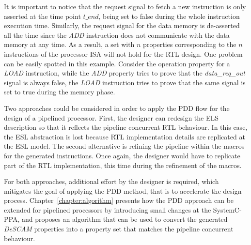 It is important to notice that the request signal to fetch a new instruction is only asserted at the time point $t\_end$, being set to false during the whole instruction execution time. Similarly, the request signal for the data memory is de-asserted all the time since the \textit{ADD} instruction does not communicate with the data memory at any time. As a result, a set with $n$ properties corresponding to the $n$ instructions of the processor ISA will not hold for the RTL design. One problem can be easily spotted in this example. Consider the operation property for a \textit{LOAD} instruction, while the \textit{ADD} property tries to prove that the \textit{data\_req\_out} signal is always false, the \textit{LOAD} instruction tries to prove that the same signal is set to true during the memory phase.

Two approaches could be considered in order to apply the PDD flow for the design of a pipelined processor. First, the designer can redesign the ELS description so that it reflects the pipeline concurrent RTL behaviour. In this case, the ESL abstraction is lost because RTL implementation details are replicated at the ESL model. The second alternative is refining the pipeline within the macros for the generated instructions. Once again, the designer would have to replicate part of the RTL implementation, this time during the refinement of the macros. 

For both approaches, additional effort by the designer is required, which mitigates the goal of applying the PDD method, that is to accelerate the design process. Chapter~\ref{chapter:algorithm} presents how the PDD approach can be extended for pipelined processors by introducing small changes at the SystemC-PPA, and proposes an algorithm that can be used to convert the generated \textit{DeSCAM} properties into a property set that matches the pipeline concurrent behaviour. 

